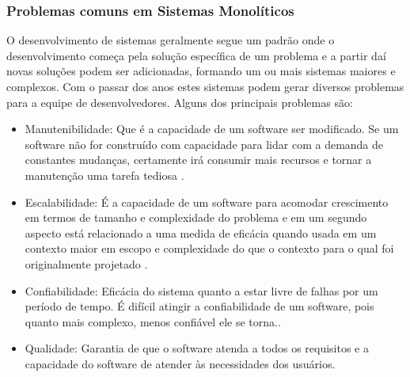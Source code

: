 \documentclass[12pt]{article}
\begin{document}
\subsubsection{Problemas comuns em Sistemas Monolíticos} 
O desenvolvimento de sistemas geralmente segue um padrão onde o desenvolvimento começa pela solução específica de um problema e a partir daí novas soluções podem ser adicionadas, formando um ou mais sistemas maiores e complexos. Com o passar dos anos estes sistemas podem gerar diversos problemas para a equipe de desenvolvedores. Alguns dos principais problemas são:
\begin{itemize}
	\item Manutenibilidade: Que é a capacidade de um software ser modificado. Se um software não for construído com capacidade para lidar com a demanda de constantes mudanças, certamente irá consumir mais recursos e tornar a manutenção uma tarefa tediosa \cite{Velmourougan2014}.
	\item Escalabilidade: É a capacidade de um software para acomodar crescimento em termos de tamanho e complexidade do problema e em um segundo aspecto está relacionado a uma medida de eficácia quando usada em um contexto maior em escopo e complexidade do que o contexto para o qual foi originalmente projetado \cite{Ibrahim2009}.
	\item Confiabilidade: Eficácia do sistema quanto a estar livre de falhas por um período de tempo. É difícil atingir a confiabilidade de um software, pois quanto mais complexo, menos confiável ele se torna.\cite{pan1999}.
	\item Qualidade: Garantia de que o software atenda a todos os requisitos e a capacidade do software de atender às necessidades dos usuários.
\end{itemize}

\end{document}
